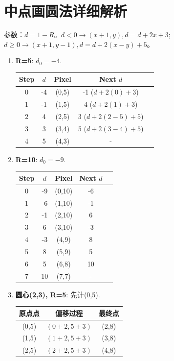 \documentclass[UTF8]{ctexart}
\begin{document}
\section{中点画圆法详细解析}
参数：$d=1-R$。$d<0 \to (x+1,y), d=d+2x+3$; $d \ge 0 \to (x+1,y-1), d=d+2(x-y)+5$。

\begin{enumerate}
    \item \textbf{R=5}: $d_0=-4$.
    \begin{center}
    \begin{tabular}{ccccc}
    \toprule Step & $d$ & Pixel & Next $d$ \\ \midrule
    0 & -4 & (0,5) & -1 ($d+2(0)+3$) \\
    1 & -1 & (1,5) & 4 ($d+2(1)+3$) \\ 2 & 4 & (2,5) & 3 ($d+2(2-5)+5$) \\
    3 & 3 & (3,4) & 5 ($d+2(3-4)+5$) \\ 4 & 5 & (4,3) & - \\ \bottomrule
    \end{tabular}
    \end{center}
    \item \textbf{R=10}: $d_0=-9$.
    \begin{center}
    \begin{tabular}{ccccc}
    \toprule Step & $d$ & Pixel & Next $d$ \\ \midrule
    0 & -9 & (0,10) & -6 \\
    1 & -6 & (1,10) & -1 \\ 2 & -1 & (2,10) & 6 \\
    3 & 6 & (3,10) & -3 \\ 4 & -3 & (4,9) & 8 \\
    5 & 8 & (5,9) & 5 \\ 6 & 5 & (6,8) & 10 \\
    7 & 10 & (7,7) & - \\ \bottomrule
    \end{tabular}
    \end{center}
    \item \textbf{圆心(2,3), R=5}: 先计(0,5).
    \begin{center}
    \begin{tabular}{ccc}
    \toprule 原点点 & 偏移过程 & 最终点 \\ \midrule
    (0,5) & $(0+2, 5+3)$ & (2,8) \\
    (1,5) & $(1+2, 5+3)$ & (3,8) \\ (2,5) & $(2+2, 5+3)$ & (4,8) \\

\end{tabular}
\end{center}
\end{enumerate}
\end{document}
